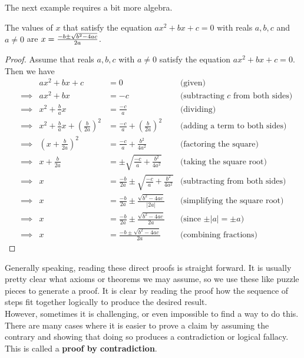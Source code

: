 The next example requires a bit more algebra.
\begin{theorem}
    The values of $x$ that satisfy the equation $ax^2+bx+c=0$ with reals $a,b,c$ and $a\neq 0$ are $x=\Large{\frac{-b\pm\sqrt{b^2 - 4ac}}{2a}}$.
\end{theorem}
\vspace{-3.5mm}
\begin{proof}
    Assume that reals $a,b,c$ with $a\neq 0$ satisfy the equation $ax^2+bx+c=0$. Then we have
    \begin{align*}
        & & ax^2+bx+c &= 0 &\text{(given)}\\
        &\implies & ax^2+bx &= -c &\text{(subtracting $c$ from both sides)}\\
        &\implies & x^2 + \frac{b}{a}x &= \frac{-c}{a} &\text{(dividing)}\\
        &\implies & x^2 + \frac{b}{a}x + \left(\frac{b}{2a}\right)^2 &= \frac{-c}{a} + \left(\frac{b}{2a}\right)^2 &\text{(adding a term to both sides)}\\
        &\implies & \left(x + \frac{b}{2a}\right)^2 &= \frac{-c}{a} + \frac{b^2}{4a^2} &\text{(factoring the square)}\\
        &\implies & x + \frac{b}{2a} &= \pm\sqrt{\frac{-c}{a} + \frac{b^2}{4a^2}} &\text{(taking the square root)}\\
        &\implies & x &= \frac{-b}{2a} \pm\sqrt{\frac{-c}{a} + \frac{b^2}{4a^2}} &\text{(subtracting from both sides)}\\
        &\implies & x &= \frac{-b}{2a}\pm \frac{\sqrt{b^2-4ac}}{|2a|} &\text{(simplifying the square root)}\\
         &\implies & x &= \frac{-b}{2a}\pm \frac{\sqrt{b^2-4ac}}{2a} &\text{(since $\pm|a|=\pm a$)}\\
        &\implies & x &= \frac{-b\pm\sqrt{b^2 - 4ac}}{2a} &\text{(combining fractions)}
    \end{align*}
\end{proof}

Generally speaking, reading these direct proofs is straight forward. It is usually pretty clear what axioms or theorems we may assume, so we use these like puzzle pieces to generate a proof. It is clear by reading the proof how the sequence of steps fit together logically to produce the desired result. \\

However, sometimes it is challenging, or even impossible to find a way to do this. There are many cases where it is easier to prove a claim by assuming the contrary and showing that doing so produces a contradiction or logical fallacy. This is called a \textbf{proof by contradiction}. \\

